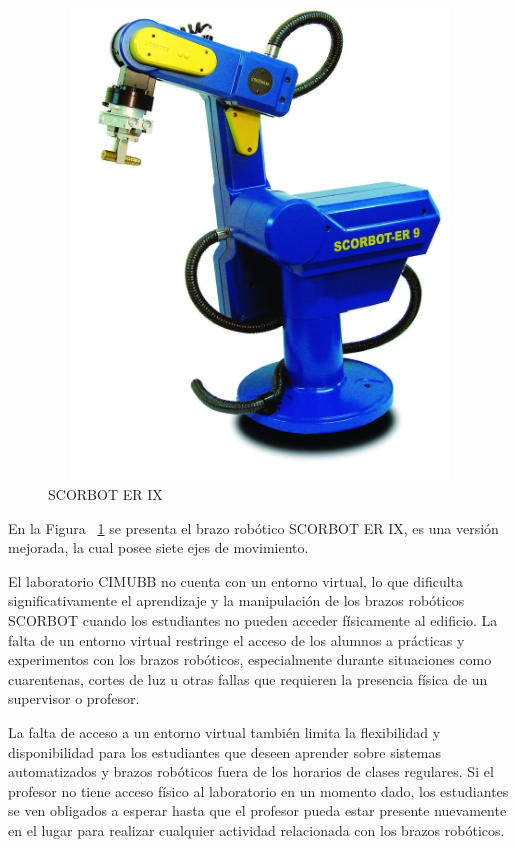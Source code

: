 \begin{figure}[ht]
\centering
\includegraphics[width=13cm, height=12.5cm]{figures/scor9.jpg}
\caption{SCORBOT ER IX}
\label{fig:scor9}
\end{figure}

En la Figura ~\ref{fig:scor9} se presenta el brazo robótico SCORBOT ER IX, es una versión mejorada, la cual posee siete ejes de movimiento.

El laboratorio CIMUBB no cuenta con un entorno virtual, lo que dificulta significativamente el aprendizaje y la manipulación de los brazos robóticos SCORBOT cuando los estudiantes no pueden acceder físicamente al edificio. La falta de un entorno virtual restringe el acceso de los alumnos a prácticas y experimentos con los brazos robóticos, especialmente durante situaciones como cuarentenas, cortes de luz u otras fallas que requieren la presencia física de un supervisor o profesor.

La falta de acceso a un entorno virtual también limita la flexibilidad y disponibilidad para los estudiantes que deseen aprender sobre sistemas automatizados y brazos robóticos fuera de los horarios de clases regulares. Si el profesor no tiene acceso físico al laboratorio en un momento dado, los estudiantes se ven obligados a esperar hasta que el profesor pueda estar presente nuevamente en el lugar para realizar cualquier actividad relacionada con los brazos robóticos.